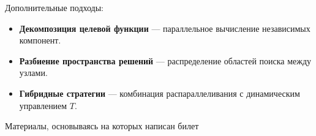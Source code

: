 Дополнительные подходы:
\begin{itemize}
    \item \textbf{Декомпозиция целевой функции} — параллельное вычисление независимых компонент.
    \item \textbf{Разбиение пространства решений} — распределение областей поиска между узлами.
    \item \textbf{Гибридные стратегии} — комбинация распараллеливания с динамическим управлением $T$.
\end{itemize}

Материалы, основываясь на которых написан билет~\cite{kostenko_lectures}
